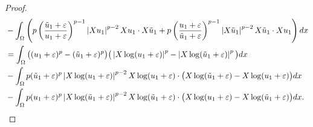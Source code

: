 \documentclass[a4paper,12pt,reqno]{amsart}
\numberwithin{equation}{section}
\theoremstyle{plain}
\theoremstyle{definition}
\begin{document}
\begin{proof}
\begin{equation}
\begin{aligned}
&-\int_{\Omega}\left(p\left(\frac{\Tilde{u}_{1}+\varepsilon}{u_{1}+\varepsilon}\right)^{p-1}\left|X u_{1}\right|^{p-2} X u_{1} \cdot X \Tilde{u}_{1}+p\left(\frac{u_{1}+\varepsilon}{\Tilde{u}_{1}+\varepsilon}\right)^{p-1}\left|X \Tilde{u}_{1}\right|^{p-2} X \Tilde{u}_{1} \cdot X u_{1}\right) d x \\
&= \int_{\Omega}\big((u_{1}+\varepsilon)^{p}-(\Tilde{u}_{1}+\varepsilon)^{p}\big)\big(\left|X \log (u_{1}+\varepsilon)\right|^{p}-\left|X \log (\Tilde{u}_{1}+\varepsilon)\right|^{p}\big) d x \\
&-\int_{\Omega} p (\Tilde{u}_{1}+\varepsilon)^{p}\left|X \log (u_{1}+\varepsilon)\right|^{p-2} X \log (u_{1}+\varepsilon) \cdot\big(X \log (\Tilde{u}_{1}+\varepsilon)-X \log (u_{1}+\varepsilon)\big) d x \\
&-\int_{\Omega} p (u_{1}+\varepsilon)^{p}\left|X \log (\Tilde{u}_{1}+\varepsilon)\right|^{p-2} X \log (\Tilde{u}_{1}+\varepsilon) \cdot\big(X \log (u_{1}+\varepsilon)-X \log (\Tilde{u}_{1}+\varepsilon)\big) d x.
\end{aligned}
\end{equation}


\end{proof}
\end{document}
